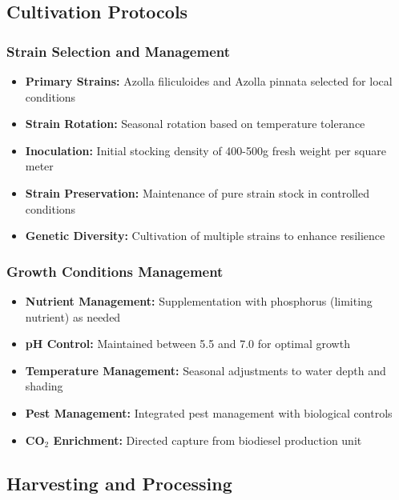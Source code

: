 \subsection{Cultivation Protocols}

\subsubsection{Strain Selection and Management}
\begin{itemize}
    \item \textbf{Primary Strains:} Azolla filiculoides and Azolla pinnata selected for local conditions
    \item \textbf{Strain Rotation:} Seasonal rotation based on temperature tolerance
    \item \textbf{Inoculation:} Initial stocking density of 400-500g fresh weight per square meter
    \item \textbf{Strain Preservation:} Maintenance of pure strain stock in controlled conditions
    \item \textbf{Genetic Diversity:} Cultivation of multiple strains to enhance resilience
\end{itemize}

\subsubsection{Growth Conditions Management}
\begin{itemize}
    \item \textbf{Nutrient Management:} Supplementation with phosphorus (limiting nutrient) as needed
    \item \textbf{pH Control:} Maintained between 5.5 and 7.0 for optimal growth
    \item \textbf{Temperature Management:} Seasonal adjustments to water depth and shading
    \item \textbf{Pest Management:} Integrated pest management with biological controls
    \item \textbf{CO$_2$ Enrichment:} Directed capture from biodiesel production unit
\end{itemize}

\subsection{Harvesting and Processing}

